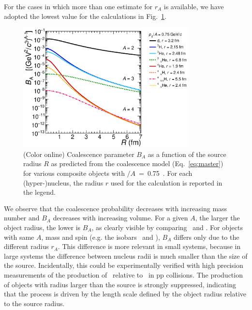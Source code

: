 \documentclass{appolb}
\begin{document}
For the cases in which more than one estimate for $r_A$ is available, we have adopted the lowest value for the calculations in Fig.~\ref{Fig:BA}.
%
%
\begin{figure}[htb]
\begin{center}
\includegraphics[width=0.8\textwidth]{coalescenceBA075.eps}
\caption{(Color online) Coalescence parameter $B_A$ as a function of the source radius $R$ as predicted from the coalescence model (Eq.~\ref{eq:master}) for various composite objects with \pt$/A$~=~0.75~\GeVc. For each (hyper-)nucleus, the radius $r$ used for the calculation is reported in the legend.}
\label{Fig:BA}
\end{center}
\end{figure} 
%
%
We observe that the coalescence probability decreases with increasing mass number and $B_A$ decreases with increasing volume. 
For a given $A$, the larger the object radius, the lower is $B_A$, as clearly visible by comparing \hethree~and \hthreelambda. 
For objects with same $A$, mass and spin (e.g. the isobars \tritium~and \hethree), $B_A$ differs only due to the different radius $r_A$. 
This difference is more relevant in small systems, because in large systems the difference between nucleus radii is much smaller than the size of the source.  
Incidentally, this could be experimentally verified with high precision measurements of the production of \tritium~relative to \hethree~in pp collisions. 
The production of objects with radius larger than the source is strongly suppressed, indicating that the process is driven by the length scale defined by the object radius relative to the source radius.
\end{document}

